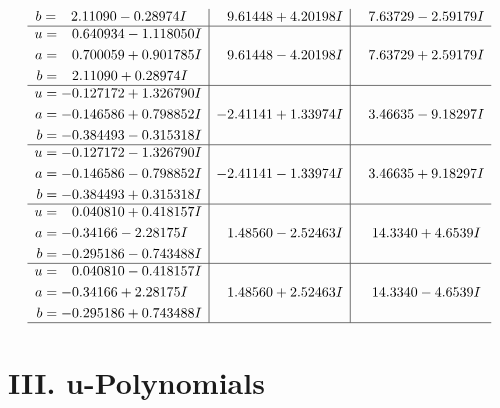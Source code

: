 \documentclass[1p]{elsarticle_modified}
\theoremstyle{definition}
\begin{document}
$$\begin{array}{c|c|c}
\begin{aligned}
b &= \phantom{-}2.11090 - 0.28974 I\end{aligned}
 & \phantom{-}9.61448 + 4.20198 I & \phantom{-}7.63729 - 2.59179 I \\ \hline\begin{aligned}
u &= \phantom{-}0.640934 - 1.118050 I \\
a &= \phantom{-}0.700059 + 0.901785 I \\
b &= \phantom{-}2.11090 + 0.28974 I\end{aligned}
 & \phantom{-}9.61448 - 4.20198 I & \phantom{-}7.63729 + 2.59179 I \\ \hline\begin{aligned}
u &= -0.127172 + 1.326790 I \\
a &= -0.146586 + 0.798852 I \\
b &= -0.384493 - 0.315318 I\end{aligned}
 & -2.41141 + 1.33974 I & \phantom{-}3.46635 - 9.18297 I \\ \hline\begin{aligned}
u &= -0.127172 - 1.326790 I \\
a &= -0.146586 - 0.798852 I \\
b &= -0.384493 + 0.315318 I\end{aligned}
 & -2.41141 - 1.33974 I & \phantom{-}3.46635 + 9.18297 I \\ \hline\begin{aligned}
u &= \phantom{-}0.040810 + 0.418157 I \\
a &= -0.34166 - 2.28175 I \\
b &= -0.295186 - 0.743488 I\end{aligned}
 & \phantom{-}1.48560 - 2.52463 I & \phantom{-}14.3340 + 4.6539 I \\ \hline\begin{aligned}
u &= \phantom{-}0.040810 - 0.418157 I \\
a &= -0.34166 + 2.28175 I \\
b &= -0.295186 + 0.743488 I\end{aligned}
 & \phantom{-}1.48560 + 2.52463 I & \phantom{-}14.3340 - 4.6539 I\\
 \hline 
 \end{array}$$\newpage
\newpage\renewcommand{\arraystretch}{1}
\centering \section*{ III. u-Polynomials}
\end{document}
